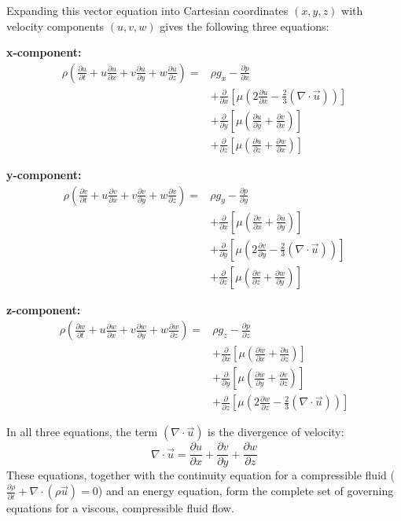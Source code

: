 \documentclass{article}
\begin{document}
Expanding this vector equation into Cartesian coordinates $(x, y, z)$ with velocity components $(u, v, w)$ gives the following three equations:

\textbf{x-component:}
\begin{align*}
\rho\left(\frac{\partial u}{\partial t} + u\frac{\partial u}{\partial x} + v\frac{\partial u}{\partial y} + w\frac{\partial u}{\partial z}\right) = & \rho g_x - \frac{\partial p}{\partial x} \\
& + \frac{\partial}{\partial x}\left[\mu\left(2\frac{\partial u}{\partial x} - \frac{2}{3}(\nabla \cdot \vec{u})\right)\right] \\
& + \frac{\partial}{\partial y}\left[\mu\left(\frac{\partial u}{\partial y} + \frac{\partial v}{\partial x}\right)\right] \\
& + \frac{\partial}{\partial z}\left[\mu\left(\frac{\partial u}{\partial z} + \frac{\partial w}{\partial x}\right)\right]
\end{align*}

\textbf{y-component:}
\begin{align*}
\rho\left(\frac{\partial v}{\partial t} + u\frac{\partial v}{\partial x} + v\frac{\partial v}{\partial y} + w\frac{\partial v}{\partial z}\right) = & \rho g_y - \frac{\partial p}{\partial y} \\
& + \frac{\partial}{\partial x}\left[\mu\left(\frac{\partial v}{\partial x} + \frac{\partial u}{\partial y}\right)\right] \\
& + \frac{\partial}{\partial y}\left[\mu\left(2\frac{\partial v}{\partial y} - \frac{2}{3}(\nabla \cdot \vec{u})\right)\right] \\
& + \frac{\partial}{\partial z}\left[\mu\left(\frac{\partial v}{\partial z} + \frac{\partial w}{\partial y}\right)\right]
\end{align*}

\textbf{z-component:}
\begin{align*}
\rho\left(\frac{\partial w}{\partial t} + u\frac{\partial w}{\partial x} + v\frac{\partial w}{\partial y} + w\frac{\partial w}{\partial z}\right) = & \rho g_z - \frac{\partial p}{\partial z} \\
& + \frac{\partial}{\partial x}\left[\mu\left(\frac{\partial w}{\partial x} + \frac{\partial u}{\partial z}\right)\right] \\
& + \frac{\partial}{\partial y}\left[\mu\left(\frac{\partial w}{\partial y} + \frac{\partial v}{\partial z}\right)\right] \\
& + \frac{\partial}{\partial z}\left[\mu\left(2\frac{\partial w}{\partial z} - \frac{2}{3}(\nabla \cdot \vec{u})\right)\right]
\end{align*}

In all three equations, the term $(\nabla \cdot \vec{u})$ is the divergence of velocity:
$$ \nabla \cdot \vec{u} = \frac{\partial u}{\partial x} + \frac{\partial v}{\partial y} + \frac{\partial w}{\partial z} $$
These equations, together with the continuity equation for a compressible fluid ($\frac{\partial \rho}{\partial t} + \nabla \cdot (\rho \vec{u}) = 0$) and an energy equation, form the complete set of governing equations for a viscous, compressible fluid flow.
\end{document}
